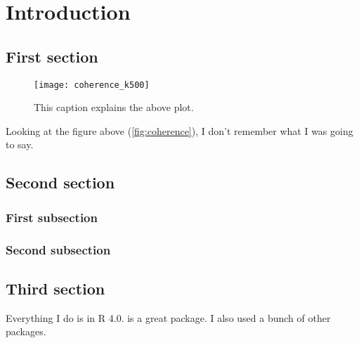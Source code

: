 \chapter{Introduction}

\section{First section}

\lipsum[3-4]

\begin{figure}[h]
	\centering
	\texttt{[image: coherence\_k500]}
	\caption{\label{fig:coherence}This caption explains the above plot.}
\end{figure}

\lipsum[5]
Looking at the figure above (\autoref{fig:coherence}), I don't remember what I was going to say.


\section{Second section}

\subsection{First subsection}

\lipsum[6-7]

\subsection{Second subsection}

\lipsum[11-12]

\section{Third section}

Everything I do is in R 4.0\supercite{R-4.0.0}. \supercite{purrr} is a great package. I also used a
bunch of other packages\supercite{qs,dplyr,ggplot2}.

\printbibliography[heading=subbibintoc,title={From reading list},keyword={reading}]

\printbibliography[heading=subbibintoc,title={Supplementary readings},notkeyword={reading}]
